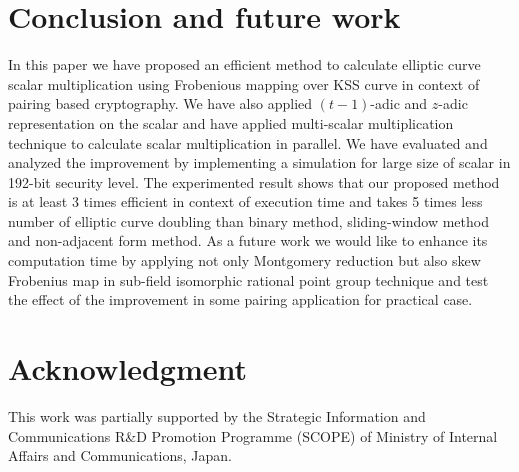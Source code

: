 \section{Conclusion and future work}
In this paper we have proposed an efficient method to calculate elliptic curve scalar multiplication using Frobenious mapping  over KSS curve in context of pairing based cryptography. We have also applied $(t-1)$-adic and $z$-adic representation on the scalar and have applied multi-scalar multiplication technique to  calculate scalar multiplication in parallel. We have evaluated and analyzed the improvement by implementing a simulation for large size of scalar in 192-bit security level. The experimented result shows that our proposed method is at least 3 times efficient in context of execution time and takes 5 times less number of elliptic curve doubling than binary method, sliding-window method and non-adjacent form method. As a future work we would like to enhance its computation time by applying not only Montgomery reduction but also skew Frobenius  map in  sub-field isomorphic rational point group technique and test the effect of the improvement in some pairing application for practical case. 

\section*{Acknowledgment}
This work was partially supported by the Strategic Information and Communications R\&D Promotion Programme (SCOPE) of Ministry of Internal Affairs and Communications, Japan. 

%
%

% 